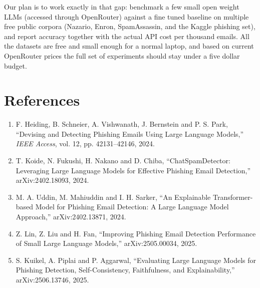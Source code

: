 \documentclass[10pt,a4paper]{article}
\begin{document}
Our plan is to work exactly in that gap: benchmark a few small open weight LLMs (accessed through OpenRouter) against a fine tuned baseline on multiple free public corpora (Nazario, Enron, SpamAssassin, and the Kaggle phishing set), and report accuracy together with the actual API cost per thousand emails. All the datasets are free and small enough for a normal laptop, and based on current OpenRouter prices the full set of experiments should stay under a five dollar budget.

\section*{References}

\begin{enumerate}
\item F. Heiding, B. Schneier, A. Vishwanath, J. Bernstein and P. S. Park, ``Devising and Detecting Phishing Emails Using Large Language Models,'' \textit{IEEE Access}, vol. 12, pp. 42131--42146, 2024.
\item T. Koide, N. Fukushi, H. Nakano and D. Chiba, ``ChatSpamDetector: Leveraging Large Language Models for Effective Phishing Email Detection,'' arXiv:2402.18093, 2024.
\item M. A. Uddin, M. Mahiuddin and I. H. Sarker, ``An Explainable Transformer-based Model for Phishing Email Detection: A Large Language Model Approach,'' arXiv:2402.13871, 2024.
\item Z. Lin, Z. Liu and H. Fan, ``Improving Phishing Email Detection Performance of Small Large Language Models,'' arXiv:2505.00034, 2025.
\item S. Kuikel, A. Piplai and P. Aggarwal, ``Evaluating Large Language Models for Phishing Detection, Self-Consistency, Faithfulness, and Explainability,'' arXiv:2506.13746, 2025.
\end{enumerate}
\end{document}
